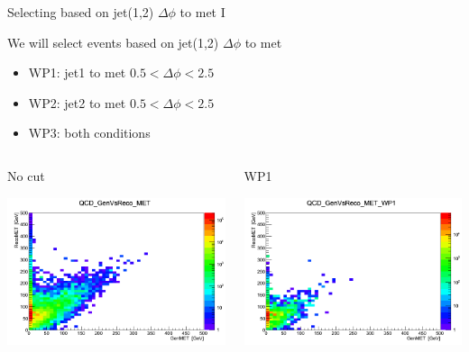\documentclass[8pt]{beamer}
\begin{document}
\begin{frame}{Selecting based on jet(1,2) $\Delta\phi$ to met I}
 
We will select events based on jet(1,2) $\Delta\phi$ to met
\begin{itemize}
  \item WP1: jet1 to met $0.5<\Delta\phi<2.5$
  \item WP2: jet2 to met $0.5<\Delta\phi<2.5$
  \item WP3: both conditions 
\end{itemize}

\begin{columns}

\begin{block}{No cut}
 
\centering
\includegraphics[width=\linewidth]{img/QCD_GenVsReco_MET.png} 
 
\end{block}

\begin{block}{WP1}

\centering
\includegraphics[width=\linewidth]{img/QCD_GenVsReco_MET_WP1.png} 
 
\end{block}

\end{columns}

\end{frame}
\end{document}
